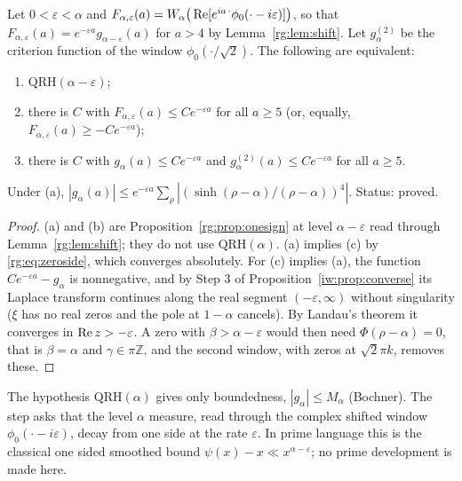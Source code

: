 \begin{proposition}\label{rg:prop:step}
Let $0<\varepsilon<\alpha$ and $F_{\alpha,\varepsilon}(a)=W_\alpha\big(\operatorname{Re}[e^{ia\,\cdot}\phi_0(\cdot-i\varepsilon)]\big)$, so that $F_{\alpha,\varepsilon}(a)=e^{-\varepsilon a}g_{\alpha-\varepsilon}(a)$ for $a>4$ by Lemma~\ref{rg:lem:shift}. Let $g^{(2)}_\alpha$ be the criterion function of the window $\phi_0(\cdot/\sqrt2)$. The following are equivalent:
\begin{enumerate}
\item[(a)] $\mathrm{QRH}(\alpha-\varepsilon)$;
\item[(b)] there is $C$ with $F_{\alpha,\varepsilon}(a)\le Ce^{-\varepsilon a}$ for all $a\ge5$ (or, equally, $F_{\alpha,\varepsilon}(a)\ge-Ce^{-\varepsilon a}$);
\item[(c)] there is $C$ with $g_\alpha(a)\le Ce^{-\varepsilon a}$ and $g^{(2)}_\alpha(a)\le Ce^{-\varepsilon a}$ for all $a\ge5$.
\end{enumerate}
Under (a), $|g_\alpha(a)|\le e^{-\varepsilon a}\sum_\rho|(\sinh(\rho-\alpha)/(\rho-\alpha))^4|$. Status: proved.
\end{proposition}

\begin{proof}
(a) and (b) are Proposition~\ref{rg:prop:onesign} at level $\alpha-\varepsilon$ read through Lemma~\ref{rg:lem:shift}; they do not use $\mathrm{QRH}(\alpha)$. (a) implies (c) by \eqref{rg:eq:zeroside}, which converges absolutely. For (c) implies (a), the function $Ce^{-\varepsilon a}-g_\alpha$ is nonnegative, and by Step 3 of Proposition~\ref{iw:prop:converse} its Laplace transform continues along the real segment $(-\varepsilon,\infty)$ without singularity ($\xi$ has no real zeros and the pole at $1-\alpha$ cancels). By Landau's theorem \cite{Widder41} it converges in $\operatorname{Re} z>-\varepsilon$. A zero with $\beta>\alpha-\varepsilon$ would then need $\Phi(\rho-\alpha)=0$, that is $\beta=\alpha$ and $\gamma\in\pi\mathbb Z$, and the second window, with zeros at $\sqrt2\pi k$, removes these.
\end{proof}

The hypothesis $\mathrm{QRH}(\alpha)$ gives only boundedness, $|g_\alpha|\le M_\alpha$ (Bochner). The step asks that the level $\alpha$ measure, read through the complex shifted window $\phi_0(\cdot-i\varepsilon)$, decay from one side at the rate $\varepsilon$. In prime language this is the classical one sided smoothed bound $\psi(x)-x\ll x^{\alpha-\varepsilon}$; no prime development is made here.

